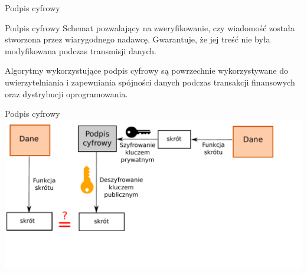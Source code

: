 \begin{frame}{Podpis cyfrowy}
	\begin{alertblock}{Podpis cyfrowy}
		Schemat pozwalający na zweryfikowanie, czy wiadomość została stworzona przez wiarygodnego nadawcę. Gwarantuje, że jej treść nie była modyfikowana podczas transmisji danych.
	\end{alertblock}	
	Algorytmy wykorzystujące podpis cyfrowy są powrzechnie wykorzystywane	 do uwierzytelniania i zapewniania spójności danych podczas transakcji finansowych oraz dystrybucji oprogramowania. 
\end{frame}

\begin{frame}{Podpis cyfrowy}
		\includegraphics[height=0.5\paperwidth]{images/dig-sign.pdf}
\end{frame}
